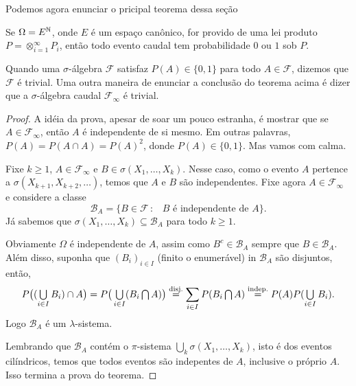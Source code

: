 Podemos agora enunciar o pricipal teorema dessa seção

\begin{theorem}
  Se $\Omega = E^{{\mathbb N}}$, onde $E$ é um espaço canônico, for provido de uma lei produto $P = \otimes_{i=1}^\infty P_i$, então todo evento caudal tem probabilidade $0$ ou $1$ sob $P$.
\end{theorem}

Quando uma $\sigma$-álgebra $\mathcal{F}$ satisfaz $P(A) \in \{0,1\}$ para todo $A \in \mathcal{F}$, dizemos que $\mathcal{F}$ é trivial. 
Uma outra maneira de enunciar a conclusão do teorema acima é dizer que a $\sigma$-álgebra caudal $\mathcal{F}_\infty$ é trivial.

\begin{proof}
  A idéia da prova, apesar de soar um pouco estranha, é mostrar que se $A \in \mathcal{F}_\infty$, então $A$ é independente de si mesmo.
  Em outras palavras, $P(A) = P(A \cap A) = P(A)^2$, donde $P(A) \in \{0,1\}$.
  Mas vamos com calma.

  Fixe $k \geq 1$, $A \in \mathcal{F}_\infty$ e $B \in \sigma(X_1, \dots, X_k)$.
  Nesse caso, como o evento $A$ pertence a $\sigma(X_{k+1}, X_{k+2}, \dots)$, temos que $A$ e $B$ são independentes.
  Fixe agora $A \in \mathcal{F}_\infty$ e considere a classe
  \begin{equation}
    \mathcal{B}_A = \{B \in \mathcal{F}\, : \, \text{ $B$ é independente de $A$}\}.
  \end{equation}
  Já sabemos que $\sigma(X_1, \dots, X_k) \subseteq \mathcal{B}_A$ para todo $k \geq 1$.

  Obviamente $\Omega$ é independente de $A$, assim como $B^c \in \mathcal{B}_A$ sempre que $B \in \mathcal{B}_A$.
  Além disso, suponha que $(B_i)_{i\in I}$ (finito o enumerável) in $\mathcal{B}_A$ são disjuntos, então,
  \begin{equation*}
    P\big( (\operatorname*{{\textstyle \bigcup}}_{i\in I} B_i) \cap A \big) = P\big( \operatorname*{{\textstyle \bigcup}}_{i\in I} (B_i \operatorname*{{\textstyle \bigcap}} A) \big) \overset{\text{disj.}}= \sum_{i\in I} P(B_i \operatorname*{{\textstyle \bigcap}} A) \overset{\text{indep.}}
    = P(A) P(\operatorname*{{\textstyle \bigcup}}_{i\in I} B_i).
  \end{equation*}
  Logo $\mathcal{B}_A$ é um $\lambda$-sistema.

  Lembrando que $\mathcal{B}_A$ contém o $\pi$-sistema $\bigcup_k \sigma(X_1, \dots, X_k)$, isto é dos eventos cilíndricos, temos que todos eventos são indepentes de $A$, inclusive o próprio $A$.
  Isso termina a prova do teorema.
\end{proof}

